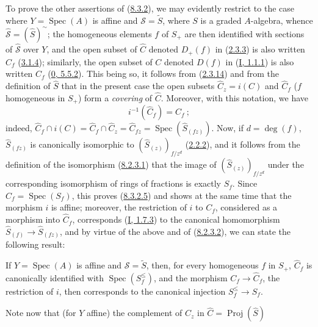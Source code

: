 To prove the other assertions of
(\hyperref[II.8.3.2]{8.3.2}), we may evidently restrict to the case where
$Y=\operatorname{Spec}(A)$ is affine and $\mathcal{S}=\widetilde{S}$, where $S$
is a graded $A$-algebra, whence
$\widehat{\mathcal{S}}=(\widehat{S})^{\sim}$; the homogeneous elements $f$ of
$S_+$ are then identified with sections of $\widehat{\mathcal{S}}$ over
$Y$, and the open subset of $\widehat{C}$ denoted $D_+(f)$ in
(\hyperref[II.2.3.3]{2.3.3}) is also written $\widehat{C}_f$
(\hyperref[II.3.1.4]{3.1.4}); similarly, the open subset of $C$ denoted
$D(f)$ in (\hyperref[I.1.1.1]{I, 1.1.1}) is also written $C_f$
(\hyperref[0.5.5.2]{0, 5.5.2}). This being so, it follows from
(\hyperref[II.2.3.14]{2.3.14}) and from the definition of $\widehat{S}$ that
in the present case the open subsets $\widehat{C}_z=i(C)$ and $\widehat{C}_f$
($f$ homogeneous in $S_+$) form a \emph{covering} of
$\widehat{C}$. Moreover, with this notation, we have
\begin{equation}
\label{II.8.3.2.5}
  i^{-1}(\widehat{C}_f)=C_f~;
\tag{8.3.2.5}
\end{equation}
indeed,
$\widehat{C}_f\cap i(C)=\widehat{C}_f\cap\widehat{C}_z
=\widehat{C}_{fz}=\operatorname{Spec}(\widehat{S}_{(fz)})$. Now, if
$d=\deg(f)$, $\widehat{S}_{(fz)}$ is canonically isomorphic to
$(\widehat{S}_{(z)})_{f/z^d}$ (\hyperref[II.2.2.2]{2.2.2}), and it follows
from the definition of the isomorphism
(\hyperref[II.8.2.3.1]{8.2.3.1}) that the image of
$(\widehat{S}_{(z)})_{f/z^d}$ under the corresponding isomorphism of rings of
fractions is exactly $S_f$. Since $C_f=\operatorname{Spec}(S_f)$, this
proves (\hyperref[II.8.3.2.5]{8.3.2.5}) and shows at the same time that the
morphism $i$ is affine; moreover, the restriction of $i$ to $C_f$,
considered as a morphism into $\widehat{C}_f$, corresponds
(\hyperref[I.1.7.3]{I, 1.7.3}) to the canonical homomorphism
$\widehat{S}_{(f)}\to\widehat{S}_{(fz)}$, and by virtue of the above and of
(\hyperref[II.8.2.3.2]{8.2.3.2}), we can state the following result:

\begin{env}[8.3.2.6]
\label{II.8.3.2.6}
If $Y=\operatorname{Spec}(A)$ is affine and $\mathcal{S}=\widetilde{S}$,
then, for every homogeneous $f$ in $S_+$, $\widehat{C}_f$ is canonically
identified with $\operatorname{Spec}(S_f^{\leq})$, and the morphism
$C_f\to\widehat{C}_f$, the restriction of $i$, then corresponds to the canonical
injection $S_f^{\leq}\to S_f$.
\end{env}

Note now that (for $Y$ affine) the complement of
$\widehat{C}_z$ in $\widehat{C}=\operatorname{Proj}(\widehat{S})$

